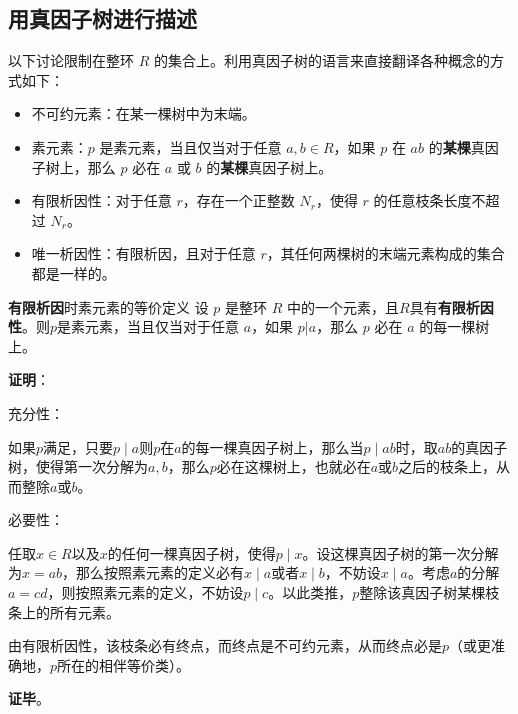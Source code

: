 

\subsection{用真因子树进行描述}

以下讨论限制在整环 $R$ 的集合上。利用真因子树的语言来直接翻译各种概念的方式如下：

\begin{definition}{}\label{def_FctTre_1}
\begin{itemize}
\item 不可约元素：在某一棵树中为末端。
\item 素元素：$p$ 是素元素，当且仅当对于任意 $a, b\in R$，如果 $p$ 在 $ab$ 的\textbf{某棵}真因子树上，那么 $p$ 必在 $a$ 或 $b$ 的\textbf{某棵}真因子树上。
\item 有限析因性：对于任意 $r$，存在一个正整数 $N_r$，使得 $r$ 的任意枝条长度不超过 $N_r$。
\item 唯一析因性：有限析因，且对于任意 $r$，其任何两棵树的末端元素构成的集合都是一样的。
\end{itemize}
\end{definition}

\begin{theorem}{\textbf{有限析因}时素元素的等价定义}\label{the_FctTre_1}
设 $p$ 是整环 $R$ 中的一个元素，且$R$具有\textbf{有限析因性}。则$p$是素元素，当且仅当对于任意 $a$，如果 $p|a$，那么 $p$ 必在 $a$ 的每一棵树上。
\end{theorem}



\textbf{证明}：

充分性：

如果$p$满足，只要$p\mid a$则$p$在$a$的每一棵真因子树上，那么当$p\mid ab$时，取$ab$的真因子树，使得第一次分解为$a, b$，那么$p$必在这棵树上，也就必在$a$或$b$之后的枝条上，从而整除$a$或$b$。

必要性：

任取$x\in R$以及$x$的任何一棵真因子树，使得$p\mid x$。设这棵真因子树的第一次分解为$x=ab$，那么按照素元素的定义必有$x\mid a$或者$x\mid b$，不妨设$x\mid a$。考虑$a$的分解$a=cd$，则按照素元素的定义，不妨设$p\mid c$。以此类推，$p$整除该真因子树某棵枝条上的所有元素。

由有限析因性，该枝条必有终点，而终点是不可约元素，从而终点必是$p$（或更准确地，$p$所在的相伴等价类）。

\textbf{证毕}。





